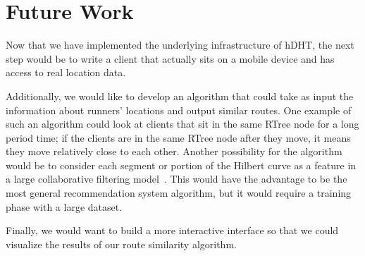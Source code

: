 \section{Future Work} \label{section:future-work}
Now that we have implemented the underlying infrastructure of hDHT, the next step would be to write a client that actually sits on a mobile device and has access to real location data.

Additionally, we would like to develop an algorithm that could take as input the information about runners' locations and output similar routes.
One example of such an algorithm could look at clients that sit in the same RTree node for a long period time; if the clients are in the same RTree node after they move, it means they move relatively close to each other.
Another possibility for the algorithm would be to consider each segment or portion of the Hilbert curve as a feature in a large collaborative filtering model~\cite{Sarwar:2001:ICF:371920.372071}. This would have the advantage to be the most general recommendation system algorithm, but it would require a training phase with a large dataset.

Finally, we would want to build a more interactive interface so that we could visualize the results of our route similarity algorithm.
